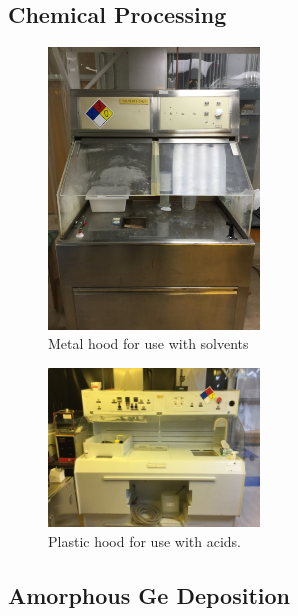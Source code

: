 \subsection{Chemical Processing}

\begin{figure}[htpb]
\centering
\includegraphics[width=0.5\textwidth]{figures/metal-hood.jpg}
\caption{Metal hood for use with solvents}
\label{metalhood}
\end{figure}


\begin{figure}[htpb]
\centering
\includegraphics[width=0.5\textwidth]{figures/plastic-hood.jpg}
\caption{Plastic hood for use with acids.}
\label{plastichood}
\end{figure}



\subsection{Amorphous Ge Deposition}

